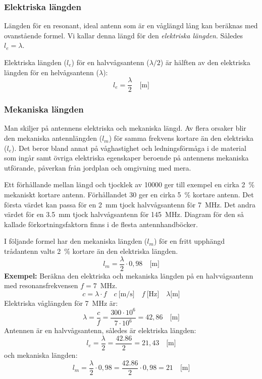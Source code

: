 \subsubsection{Elektriska längden}

Längden för en resonant, ideal antenn som är en våglängd lång kan beräknas med
ovanstående formel.
Vi kallar denna längd för den \emph{elektriska längden}.
Således \(l_e = \lambda\).

Elektriska längden (\(l_e\)) för en halvvågsantenn (\(\lambda/2\)) är hälften
av den elektriska längden för en helvågsantenn (\(\lambda\)):
\[l_e = \frac{\lambda}{2} \quad \text{[m]}\]

\subsubsection{Mekaniska längden}

Man skiljer på antennens elektriska och mekaniska längd.
Av flera orsaker blir den mekaniska antennlängden (\(l_m\)) för samma
frekvens kortare än den elektriska (\(l_e\)).
Det beror bland annat på våghastighet och ledningsförmåga i de material som
ingår samt övriga elektriska egenskaper beroende på antennens mekaniska
utförande, påverkan från jordplan och omgivning med mera.

Ett förhållande mellan längd och tjocklek av 10000 ger till exempel en cirka 2~\%
mekaniskt kortare antenn.
Förhållandet 30 ger en cirka 5~\% kortare antenn.
Det första värdet kan passa för en \SI{2}{\milli\metre} tjock halvvågsantenn för
\SI{7}{\mega\hertz}.
Det andra värdet för en \SI{3,5}{\milli\metre} tjock halvvågsantenn för
\SI{145}{\mega\hertz}.
Diagram för den så kallade förkortningsfaktorn finns i de flesta
antennhandböcker.

I följande formel har den mekaniska längden (\(l_m\)) för en fritt upphängd
trådantenn valts 2~\% kortare än den elektriska längden.
\[l_m = \frac{\lambda}{2} \cdot 0,98 \quad \text{[m]}\]
\textbf{Exempel:}
Beräkna den elektriska och mekaniska längden på en halvvågsantenn med
resonansfrekvensen \(f = 7\)~MHz.
\[
c = \lambda \cdot f
\quad c\ \text{[m/s]} \quad f\ \text{[Hz]} \quad \lambda \text{[m]}
\]
Elektriska våglängden för \SI{7}{\mega\hertz} är:
\[
\lambda = \frac{c}{f} = \frac{300 \cdot 10^6}{7 \cdot 10^6} = 42,86
\quad \text{[m]}
\]
Antennen är en halvvågsantenn, således är elektriska längden:
\[
l_e = \frac{\lambda}{2} = \frac{42.86}{2} = 21,43 \quad \text{[m]}
\]
och mekaniska längden:
\[
l_m = \frac{\lambda}{2} \cdot 0,98 = \frac{42.86}{2}\cdot 0,98 = 21
\quad \text{[m]}
\]

